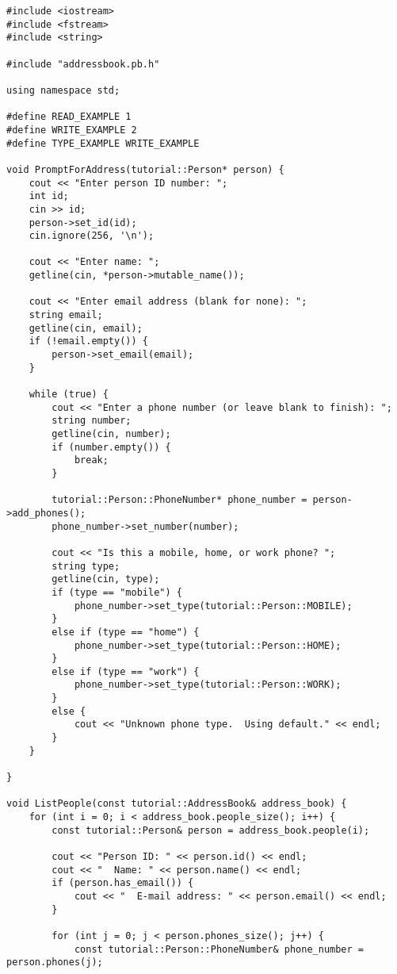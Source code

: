 \begin{lstlisting}[style=CodeListing, label=code:proto_utility, caption={Утилита для работы с protobuf-сообщениями}]
#include <iostream>
#include <fstream>
#include <string>

#include "addressbook.pb.h"

using namespace std;

#define READ_EXAMPLE 1
#define WRITE_EXAMPLE 2
#define TYPE_EXAMPLE WRITE_EXAMPLE

void PromptForAddress(tutorial::Person* person) {
    cout << "Enter person ID number: ";
    int id;
    cin >> id;
    person->set_id(id);
    cin.ignore(256, '\n');

    cout << "Enter name: ";
    getline(cin, *person->mutable_name());

    cout << "Enter email address (blank for none): ";
    string email;
    getline(cin, email);
    if (!email.empty()) {
        person->set_email(email);
    }

    while (true) {
        cout << "Enter a phone number (or leave blank to finish): ";
        string number;
        getline(cin, number);
        if (number.empty()) {
            break;
        }

        tutorial::Person::PhoneNumber* phone_number = person->add_phones();
        phone_number->set_number(number);

        cout << "Is this a mobile, home, or work phone? ";
        string type;
        getline(cin, type);
        if (type == "mobile") {
            phone_number->set_type(tutorial::Person::MOBILE);
        }
        else if (type == "home") {
            phone_number->set_type(tutorial::Person::HOME);
        }
        else if (type == "work") {
            phone_number->set_type(tutorial::Person::WORK);
        }
        else {
            cout << "Unknown phone type.  Using default." << endl;
        }
    }

}

void ListPeople(const tutorial::AddressBook& address_book) {
    for (int i = 0; i < address_book.people_size(); i++) {
        const tutorial::Person& person = address_book.people(i);

        cout << "Person ID: " << person.id() << endl;
        cout << "  Name: " << person.name() << endl;
        if (person.has_email()) {
            cout << "  E-mail address: " << person.email() << endl;
        }

        for (int j = 0; j < person.phones_size(); j++) {
            const tutorial::Person::PhoneNumber& phone_number = person.phones(j);


\end{lstlisting}
